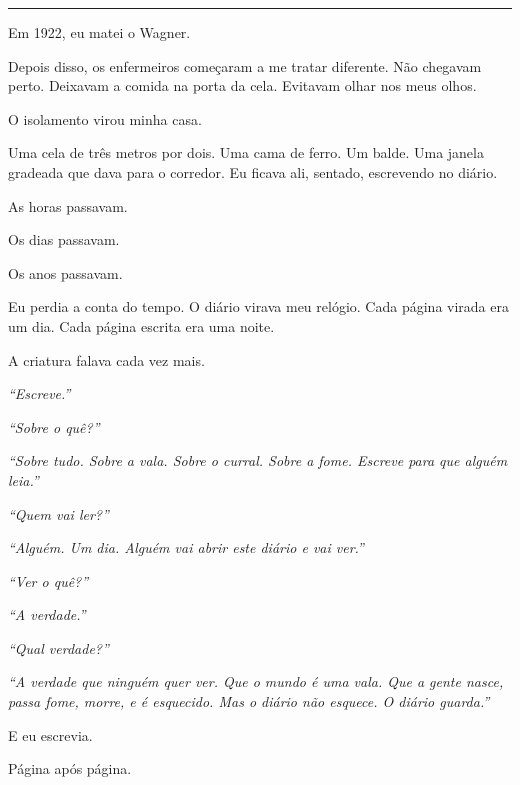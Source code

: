 \vspace{0.5em}\noindent\rule{\textwidth}{0.5pt}\vspace{0.5em}

\noindent Em 1922, eu matei o Wagner.

\noindent Depois disso, os enfermeiros começaram a me tratar diferente. Não chegavam perto. Deixavam a comida na porta da cela. Evitavam olhar nos meus olhos.

\noindent O isolamento virou minha casa.

\noindent Uma cela de três metros por dois. Uma cama de ferro. Um balde. Uma janela gradeada que dava para o corredor. Eu ficava ali, sentado, escrevendo no diário.

\noindent As horas passavam.

\noindent Os dias passavam.

\noindent Os anos passavam.

\noindent Eu perdia a conta do tempo. O diário virava meu relógio. Cada página virada era um dia. Cada página escrita era uma noite.

\noindent A criatura falava cada vez mais.

\noindent \textit{\textquotedblleft{}Escreve.\textquotedblright{}}

\noindent \textit{\textquotedblleft{}Sobre o quê?\textquotedblright{}}

\noindent \textit{\textquotedblleft{}Sobre tudo. Sobre a vala. Sobre o curral. Sobre a fome. Escreve para que alguém leia.\textquotedblright{}}

\noindent \textit{\textquotedblleft{}Quem vai ler?\textquotedblright{}}

\noindent \textit{\textquotedblleft{}Alguém. Um dia. Alguém vai abrir este diário e vai ver.\textquotedblright{}}

\noindent \textit{\textquotedblleft{}Ver o quê?\textquotedblright{}}

\noindent \textit{\textquotedblleft{}A verdade.\textquotedblright{}}

\noindent \textit{\textquotedblleft{}Qual verdade?\textquotedblright{}}

\noindent \textit{\textquotedblleft{}A verdade que ninguém quer ver. Que o mundo é uma vala. Que a gente nasce, passa fome, morre, e é esquecido. Mas o diário não esquece. O diário guarda.\textquotedblright{}}

\noindent E eu escrevia.

\noindent Página após página.

